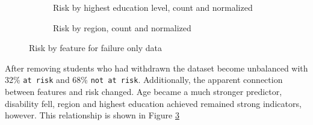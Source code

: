 \documentclass{article}
\begin{document}
\begin{figure}[h]
	\begin{subfigure}{.45\textwidth}
		\centering
		\caption{Risk by highest education level, count and normalized}
		\label{fig:risk_by_ed_nowd}
	\end{subfigure}
	\begin{subfigure}{.45\textwidth}
		\centering
		\caption{Risk by region, count and normalized}
		\label{fig:risk_by_region_nowd}
	\end{subfigure}
	\caption{Risk by feature for failure only data}
	\label{fig:feature_risk_nowd}
\end{figure}
After removing students who had withdrawn the dataset become unbalanced with 32\% \texttt{at risk} and 68\% \texttt{not at risk}. Additionally, the apparent connection between features and risk changed. Age became a much stronger predictor, disability fell, region and highest education achieved remained strong indicators, however. This relationship is shown in Figure \ref{fig:feature_risk_nowd}
\end{document}
